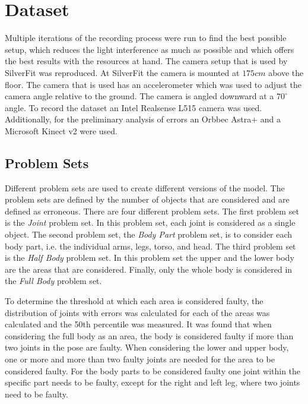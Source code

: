 \section{Dataset}
\label{sec:dataset}

Multiple iterations of the recording process were run to find the best possible setup, which reduces the light interference as much as possible and which offers the best results with the resources at hand. The camera setup that is used by SilverFit was reproduced. At SilverFit the camera is mounted at $175cm$ above the floor. The camera that is used has an accelerometer which was used to adjust the camera angle relative to the ground. The camera is angled downward at a $70^\circ$ angle. To record the dataset an Intel Realsense L515 camera was used. Additionally, for the preliminary analysis of errors an Orbbec Astra+ and a Microsoft Kinect v2 were used.

\subsection{Problem Sets}
\label{sec:problem_set}

Different problem sets are used to create different versions of the model. The problem sets are defined by the number of objects that are considered and are defined as erroneous. There are four different problem sets. The first problem set is the \textit{Joint} problem set. In this problem set, each joint is considered as a single object. The second problem set,  the \textit{Body Part} problem set, is to consider each body part, i.e. the individual arms, legs, torso, and head. The third problem set is the \textit{Half Body} problem set. In this problem set the upper and the lower body are the areas that are considered. Finally, only the whole body is considered in the \textit{Full Body} problem set.

To determine the threshold at which each area is considered faulty, the distribution of joints with errors was calculated for each of the areas was calculated and the 50th percentile was measured. It was found that when considering the full body as an area, the body is considered faulty if more than two joints in the pose are faulty. When considering the lower and upper body, one or more and more than two faulty joints are needed for the area to be considered faulty. For the body parts to be considered faulty one joint within the specific part needs to be faulty, except for the right and left leg, where two joints need to be faulty.

